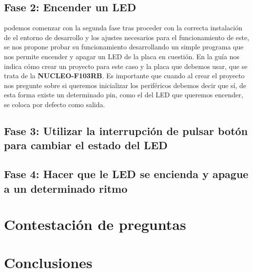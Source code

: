 \documentclass[11pt,a4paper]{article}
\begin{document}
	\subsection{Fase 2: Encender un LED}
	podemos comenzar con la segunda fase tras proceder con la correcta instalación de el entorno de desarrollo y los ajustes necesarios para el funcionamiento de este, se nos propone probar su funcionamiento desarrollando un simple programa que nos permite encender y apagar un LED de la placa en cuestión. En la guía nos indica cómo crear un proyecto para este caso y la placa que debemos usar, que se trata de la \textbf{NUCLEO-F103RB}. Es importante que cuando al crear el proyecto nos pregunte sobre si queremos inicializar los periféricos debemos decir que sí, de esta forma existe un determinado pin, como el del LED que queremos encender, se coloca por defecto como salida.
	
	\subsection{Fase 3: Utilizar la interrupción de pulsar botón para cambiar el estado del LED}
	
	\subsection{Fase 4: Hacer que le LED se encienda y apague a un determinado ritmo}
	
	\section{Contestación de preguntas}


	\section{Conclusiones}
\end{document}
